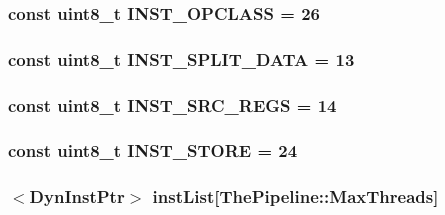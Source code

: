 \label{classInOrderCPU_a079fa8746c9fa2240354d5e9c476bb24}
\hypertarget{classInOrderCPU_ab0689a51017f8422cab595aed96c6a1a}{
\subsubsection[{INST\_\-OPCLASS}]{\setlength{\rightskip}{0pt plus 5cm}const uint8\_\-t {\bf INST\_\-OPCLASS} = 26}}
\label{classInOrderCPU_ab0689a51017f8422cab595aed96c6a1a}
\hypertarget{classInOrderCPU_aadbdb3acfa734a87e0e26c5da208bf11}{
\subsubsection[{INST\_\-SPLIT\_\-DATA}]{\setlength{\rightskip}{0pt plus 5cm}const uint8\_\-t {\bf INST\_\-SPLIT\_\-DATA} = 13}}
\label{classInOrderCPU_aadbdb3acfa734a87e0e26c5da208bf11}
\hypertarget{classInOrderCPU_af24bafb407b963ae82732cf776cf40c4}{
\subsubsection[{INST\_\-SRC\_\-REGS}]{\setlength{\rightskip}{0pt plus 5cm}const uint8\_\-t {\bf INST\_\-SRC\_\-REGS} = 14}}
\label{classInOrderCPU_af24bafb407b963ae82732cf776cf40c4}
\hypertarget{classInOrderCPU_a85aa6196492bed8f13431a172f09b83b}{
\subsubsection[{INST\_\-STORE}]{\setlength{\rightskip}{0pt plus 5cm}const uint8\_\-t {\bf INST\_\-STORE} = 24}}
\label{classInOrderCPU_a85aa6196492bed8f13431a172f09b83b}
\hypertarget{classInOrderCPU_a407a202e9777af8f3aca683ff7257693}{
\subsubsection[{instList}]{$<${\bf DynInstPtr}$>$ {\bf instList}\mbox{[}{\bf ThePipeline::MaxThreads}\mbox{]}}}
